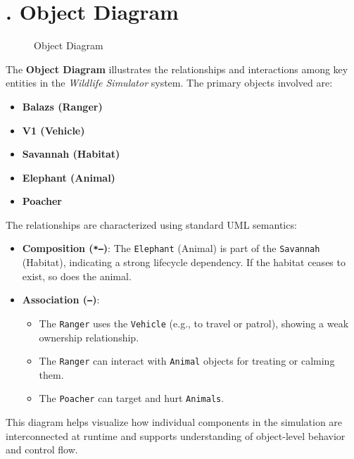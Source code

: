 \documentclass[a4paper,12pt]{article}
\begin{document}
\newpage


\section*{. Object Diagram}

\begin{figure}[H]
    \centering
    \caption{Object Diagram}
    \label{fig:object-diagram}
\end{figure}

\vspace{0.5em}

\noindent
The \textbf{Object Diagram} illustrates the relationships and interactions among key entities in the \emph{Wildlife Simulator} system. The primary objects involved are:

\begin{itemize}
    \item \textbf{Balazs (Ranger)}
    \item \textbf{V1 (Vehicle)}
    \item \textbf{Savannah (Habitat)}
    \item \textbf{Elephant (Animal)}
    \item \textbf{Poacher}
\end{itemize}

\vspace{0.5em}

\noindent
The relationships are characterized using standard UML semantics:
\begin{itemize}
    \item \textbf{Composition (\texttt{*--})}: The \texttt{Elephant} (Animal) is part of the \texttt{Savannah} (Habitat), indicating a strong lifecycle dependency. If the habitat ceases to exist, so does the animal.
    
    \item \textbf{Association (\texttt{--})}: 
    \begin{itemize}
        \item The \texttt{Ranger} uses the \texttt{Vehicle} (e.g., to travel or patrol), showing a weak ownership relationship.
        \item The \texttt{Ranger} can interact with \texttt{Animal} objects for treating or calming them.
        \item The \texttt{Poacher} can target and hurt \texttt{Animals}.
    \end{itemize}
\end{itemize}

\vspace{0.5em}

\noindent
This diagram helps visualize how individual components in the simulation are interconnected at runtime and supports understanding of object-level behavior and control flow.
\end{document}
